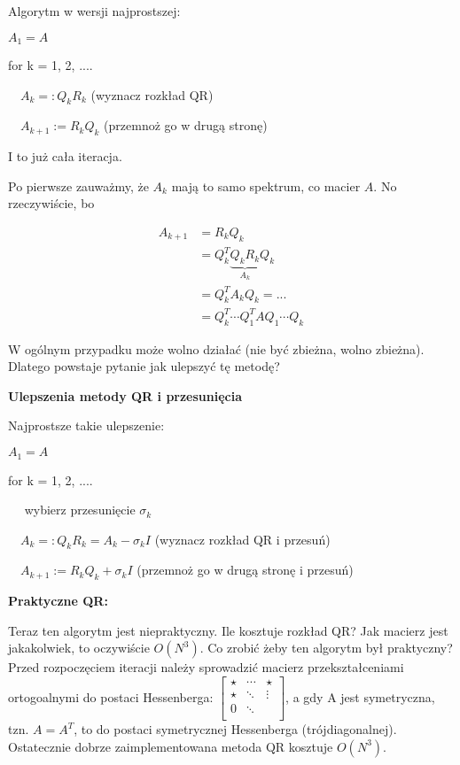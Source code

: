 \documentclass[hidelinks,a4paper]{article}
\begin{document}
Algorytm w wersji najprostszej:

$A_1 = A$

for k = 1, 2, ....

$\quad A_k =: Q_kR_k$ (wyznacz rozkład QR)
 
$\quad A_{k+1} := R_kQ_k$ (przemnoż go w drugą stronę)

I to już cała iteracja.

Po pierwsze zauważmy, że $A_k$ mają to samo spektrum, co macier $A$. No rzeczywiście, bo 

\begin{equation}
	\begin{aligned}
		A_{k+1} & = R_kQ_k                            \\
		        & = Q_k^T\underbrace{Q_kR_k}_{A_k}Q_k \\
		        & = Q_k^TA_kQ_k = ...                 \\
		        & = Q_k^T\cdots Q_1^TA Q_1 \cdots Q_k 
	\end{aligned}
\end{equation}

W ogólnym przypadku może wolno działać (nie być zbieżna, wolno zbieżna). Dlatego powstaje pytanie jak ulepszyć tę metodę? 

\textbf{Ulepszenia metody QR i przesunięcia}

Najprostsze takie ulepszenie:

$A_1 = A$

for k = 1, 2, ....

$\quad$ wybierz przesunięcie $\sigma_k$

$\quad A_k =: Q_kR_k = A_k - \sigma_k I $ (wyznacz rozkład QR i przesuń)
 
$\quad A_{k+1} := R_kQ_k + \sigma_k I$ (przemnoż go w drugą stronę i przesuń)

\textbf{Praktyczne QR:}

Teraz ten algorytm jest niepraktyczny. Ile kosztuje rozkład QR? Jak macierz jest jakakolwiek, to oczywiście $O(N^3)$. Co zrobić żeby ten algorytm był praktyczny? Przed rozpoczęciem iteracji należy sprowadzić macierz przekształceniami ortogoalnymi do postaci Hessenberga: $\left[ \begin{array}{cccc} \star & \cdots & \star \\ \star & \ddots & \vdots \\ 0 & \ddots \\  \end{array} \right]$, a gdy A jest symetryczna, tzn. $A=A^T$, to do postaci symetrycznej Hessenberga (trójdiagonalnej). Ostatecznie dobrze zaimplementowana metoda QR kosztuje $O(N^3)$.
\end{document}

